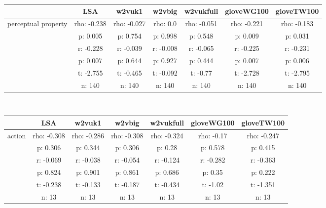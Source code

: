 \documentclass{article}
\begin{document}
\begin{tabular}{ccccccc|}\cline{2-7}
&\multicolumn{1}{|c}{LSA} & w2vuk1 & w2vbig & w2vukfull & gloveWG100 & gloveTW100 \\\hline
\multicolumn{1}{|c|}{\multirow{6}{*}{perceptual property}} & rho: -0.238 & rho: -0.027 & rho: 0.0 & rho: -0.051 & rho: -0.221 & rho: -0.183 \\
\multicolumn{1}{|c|}{} & p: 0.005 & p: 0.754 & p: 0.998 & p: 0.548 & p: 0.009 & p: 0.031 \\
\multicolumn{1}{|c|}{} & r: -0.228 & r: -0.039 & r: -0.008 & r: -0.065 & r: -0.225 & r: -0.231 \\
\multicolumn{1}{|c|}{} & p: 0.007 & p: 0.644 & p: 0.927 & p: 0.444 & p: 0.007 & p: 0.006 \\
\multicolumn{1}{|c|}{} & t: -2.755 & t: -0.465 & t: -0.092 & t: -0.77 & t: -2.728 & t: -2.795 \\
\multicolumn{1}{|c|}{} & n: 140 & n: 140 & n: 140 & n: 140 & n: 140 & n: 140 \\
\hline
\end{tabular}\\
\begin{tabular}{ccccccc|}\cline{2-7}
&\multicolumn{1}{|c}{LSA} & w2vuk1 & w2vbig & w2vukfull & gloveWG100 & gloveTW100 \\\hline
\multicolumn{1}{|c|}{\multirow{6}{*}{action}} & rho: -0.308 & rho: -0.286 & rho: -0.308 & rho: -0.324 & rho: -0.17 & rho: -0.247 \\
\multicolumn{1}{|c|}{} & p: 0.306 & p: 0.344 & p: 0.306 & p: 0.28 & p: 0.578 & p: 0.415 \\
\multicolumn{1}{|c|}{} & r: -0.069 & r: -0.038 & r: -0.054 & r: -0.124 & r: -0.282 & r: -0.363 \\
\multicolumn{1}{|c|}{} & p: 0.824 & p: 0.901 & p: 0.861 & p: 0.686 & p: 0.35 & p: 0.222 \\
\multicolumn{1}{|c|}{} & t: -0.238 & t: -0.133 & t: -0.187 & t: -0.434 & t: -1.02 & t: -1.351 \\
\multicolumn{1}{|c|}{} & n: 13 & n: 13 & n: 13 & n: 13 & n: 13 & n: 13 \\
\hline
\end{tabular}\\
\end{document}

